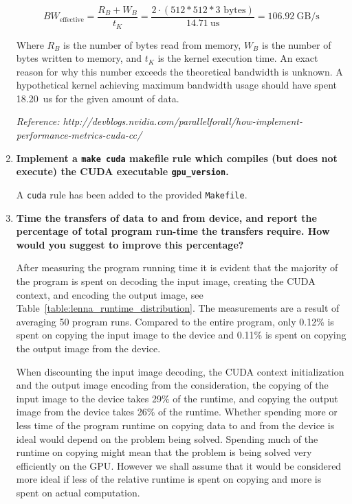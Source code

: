 \begin{enumerate}
\begin{displaymath}
\textit{BW}_\text{effective} = \frac{R_B + W_B}{t_K} = \frac{2 \cdot (512 * 512 * 3\text{~bytes})}{14.71~\text{us}} = 106.92~\text{GB/s}
\end{displaymath}

Where $R_B$ is the number of bytes read from memory, $W_B$ is the number of bytes written to memory, and $t_K$ is the kernel execution time. An exact reason for why this number exceeds the theoretical bandwidth is unknown. A hypothetical kernel achieving maximum bandwidth usage should have spent 18.20~us for the given amount of data.

\textit{Reference: http://devblogs.nvidia.com/parallelforall/how-implement-performance-metrics-cuda-cc/}

\item \textbf{Implement a \texttt{make cuda} makefile rule which compiles (but does not execute) the CUDA executable \texttt{gpu\_version}.}

A \texttt{cuda} rule has been added to the provided \texttt{Makefile}.

\item \textbf{Time the transfers of data to and from device, and report the percentage of total program run-time the transfers require. How would you suggest to improve this percentage?}

After measuring the program running time it is evident that the majority of the program is spent on decoding the input image, creating the \ac{CUDA} context, and encoding the output image, see Table~\ref{table:lenna_runtime_distribution}. The measurements are a result of averaging 50 program runs. Compared to the entire program, only 0.12\% is spent on copying the input image to the device and 0.11\% is spent on copying the output image from the device.

When discounting the input image decoding, the \ac{CUDA} context initialization and the output image encoding from the consideration, the copying of the input image to the device takes 29\% of the runtime, and copying the output image from the device takes 26\% of the runtime. Whether spending more or less time of the program runtime on copying data to and from the device is ideal would depend on the problem being solved. Spending much of the runtime on copying might mean that the problem is being solved very efficiently on the \ac{GPU}. However we shall assume that it would be considered more ideal if less of the relative runtime is spent on copying and more is spent on actual computation.


\end{enumerate}
